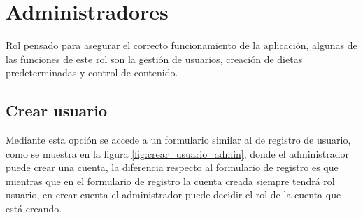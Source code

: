 
\section{Administradores}
Rol pensado para asegurar el correcto funcionamiento de la aplicación, algunas de las funciones de este rol son la gestión de usuarios, creación de dietas predeterminadas y control de contenido.

\subsection{Crear usuario}
Mediante esta opción se accede a un formulario similar al de registro de usuario, como se muestra en la figura \ref{fig:crear_usuario_admin}, donde el administrador puede crear una cuenta, la diferencia respecto al formulario de registro es que mientras que en el formulario de registro la cuenta creada siempre tendrá rol usuario, en crear cuenta el administrador puede decidir el rol de la cuenta que está creando.

